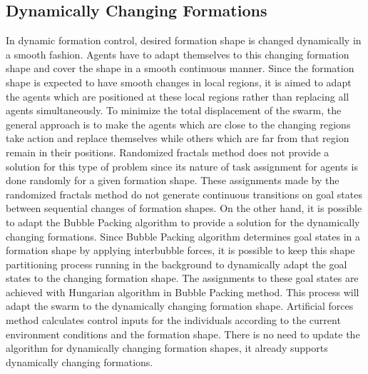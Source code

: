 \subsection{Dynamically Changing Formations} \label{dynamical_ref}
In dynamic formation control, desired formation shape is changed dynamically in a smooth fashion. Agents have to adapt themselves to this changing formation shape and cover the shape in a smooth continuous manner. Since the formation shape is expected to have smooth changes in local regions, it is aimed to adapt the agents which are positioned at these local regions rather than replacing all agents simultaneously. To minimize the total displacement of the swarm, the general approach is to make the agents which are close to the changing regions take action and replace themselves while others which are far from that region remain in their positions. Randomized fractals method does not provide a solution for this type of problem since its nature of task assignment for agents is done randomly for a given formation shape. These assignments made by the randomized fractals method do not generate continuous transitions on goal states between sequential changes of formation shapes. On the other hand, it is possible to adapt the Bubble Packing algorithm to provide a solution for the dynamically changing formations. Since Bubble Packing algorithm determines goal states in a formation shape by applying interbubble forces, it is possible to keep this shape partitioning process running in the background to dynamically adapt the goal states to the changing formation shape. The assignments to these goal states are achieved with Hungarian algorithm in Bubble Packing method. This process will adapt the swarm to the dynamically changing formation shape. Artificial forces method calculates control inputs for the individuals according to the current environment conditions and the formation shape. There is no need to update the algorithm for dynamically changing formation shapes, it already supports dynamically changing formations. 
		 

